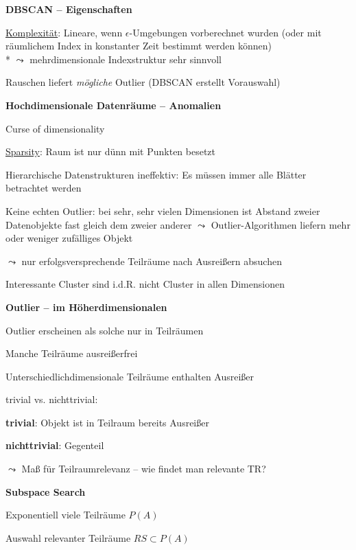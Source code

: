 \textbf{DBSCAN -- Eigenschaften}
\begin{items}
	\item \underline{Komplexität}: Lineare, wenn \( \epsilon \)-Umgebungen vorberechnet wurden (oder mit räumlichem Index in konstanter Zeit bestimmt werden können) \\* \( \leadsto \) mehrdimensionale Indexstruktur sehr sinnvoll
	\item Rauschen liefert \emph{mögliche} Outlier (DBSCAN erstellt Vorauswahl)
\end{items}

\textbf{Hochdimensionale Datenräume -- Anomalien}
\begin{items}
	\item Curse of dimensionality
	\item \underline{Sparsity}: Raum ist nur dünn mit Punkten besetzt
	\item Hierarchische Datenstrukturen ineffektiv: Es müssen immer alle Blätter betrachtet werden
	\item Keine echten Outlier: bei sehr, sehr vielen Dimensionen ist Abstand zweier Datenobjekte fast gleich dem zweier anderer \( \leadsto \) Outlier-Algorithmen liefern mehr oder weniger zufälliges Objekt
	\item \( \leadsto \) nur erfolgsversprechende Teilräume nach Ausreißern absuchen
	\item Interessante Cluster sind i.d.R. nicht Cluster in allen Dimensionen
\end{items}

\textbf{Outlier -- im Höherdimensionalen}
\begin{items}
	\item Outlier erscheinen als solche nur in Teilräumen
	\item Manche Teilräume ausreißerfrei
	\item Unterschiedlichdimensionale Teilräume enthalten Ausreißer
	\item trivial vs. nichttrivial:
	\begin{enumeration}
		\item \textbf{trivial}: Objekt ist in Teilraum bereits Ausreißer
		\item \textbf{nichttrivial}: Gegenteil
	\end{enumeration}
	\item \( \leadsto \) Maß für Teilraumrelevanz -- wie findet man relevante TR?
\end{items}

\textbf{Subspace Search}
\begin{items}
	\item Exponentiell viele Teilräume \( P(A) \)
	\item Auswahl relevanter Teilräume \( RS \subset P(A) \)
\end{items}

